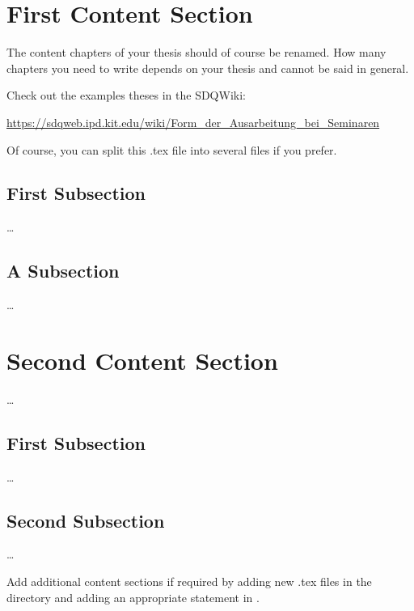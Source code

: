 

\section{First Content Section}
\label{ch:FirstContentSection}

The content chapters of your thesis should of course be renamed. How many
chapters you need to write depends on your thesis and cannot be said in general.

Check out the examples theses in the SDQWiki:

\url{https://sdqweb.ipd.kit.edu/wiki/Form_der_Ausarbeitung_bei_Seminaren}

Of course, you can split this .tex file into several files if you prefer. 


\subsection{First Subsection}
\label{sec:FirstContentSection:FirstSubSection}

\dots

\subsection{A Subsection}
\label{sec:FirstContentSection:FirstSubSubSection}

\dots


\section{Second Content Section}
\label{ch:SecondContentSection}

\dots

\subsection{First Subsection}
\label{sec:SecondContentSection:FirstSubsection}

\dots

\subsection{Second Subsection}
\label{sec:SecondContentSection:SecondSubsection}

\dots

Add additional content sections if required by adding new .tex files in the
 directory and adding an appropriate 
 statement in . 
